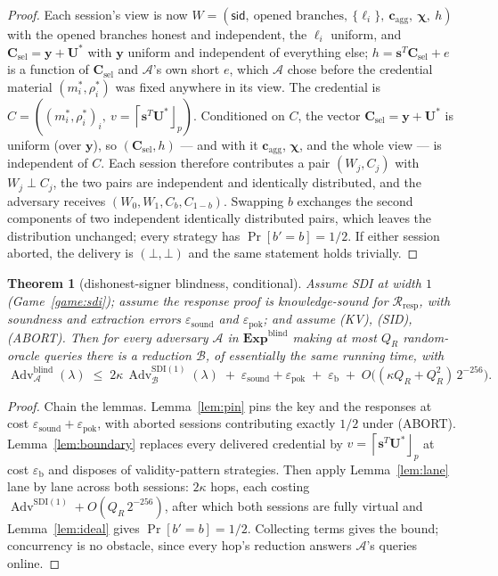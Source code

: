 \documentclass[11pt]{article}
\newcommand{\roundp}[1]{\left\lceil #1\right\rfloor_p}
\newcommand{\Adv}{\operatorname{Adv}}
\newcommand{\Exp}{\mathbf{Exp}}
\newtheorem{theorem}{Theorem}[section]
\begin{document}
\begin{proof}
Each session's view is now
$W=(\mathsf{sid},\ \text{opened branches},\ \{\ell_i\},\
 \mathbf c_{\mathrm{agg}},\ \boldsymbol\chi,\ h)$
with the opened branches honest and independent, the $\ell_i$ uniform, and
$\mathbf C_{\mathrm{sel}}=\mathbf y+\mathbf U^*$ with $\mathbf y$ uniform
and independent of everything else; $h=\mathbf s^{T}\mathbf
C_{\mathrm{sel}}+e$ is a function of $\mathbf C_{\mathrm{sel}}$ and
$\mathcal A$'s own short $e$, which $\mathcal A$ chose before the
credential material $(m_i^*,\rho_i^*)$ was fixed anywhere in its view.  The
credential is $C=((m_i^*,\rho_i^*)_i,\ v=\roundp{\mathbf s^{T}\mathbf
U^*})$.  Conditioned on $C$, the vector $\mathbf C_{\mathrm{sel}}=\mathbf
y+\mathbf U^*$ is uniform (over $\mathbf y$), so $(\mathbf
C_{\mathrm{sel}},h)$ --- and with it $\mathbf c_{\mathrm{agg}}$,
$\boldsymbol\chi$, and the whole view --- is independent of $C$.  Each
session therefore contributes a pair $(W_j,C_j)$ with $W_j\perp C_j$, the
two pairs are independent and identically distributed, and the adversary
receives $(W_0,W_1,C_b,C_{1-b})$.  Swapping $b$ exchanges the second
components of two independent identically distributed pairs, which leaves
the distribution unchanged; every strategy has $\Pr[b'=b]=1/2$.  If either
session aborted, the delivery is $(\bot,\bot)$ and the same statement holds
trivially.
\end{proof}

\begin{theorem}[dishonest-signer blindness, conditional]
\label{thm:blind}
Assume SDI at width $1$ (Game~\ref{game:sdi}); assume the response proof is
knowledge-sound for $\mathcal R_{\mathrm{resp}}$, with soundness and
extraction errors $\varepsilon_{\mathrm{sound}}$ and
$\varepsilon_{\mathrm{pok}}$; and assume (KV), (SID), (ABORT).  Then for
every adversary $\mathcal A$ in $\Exp^{\mathrm{blind}}$ making at most
$Q_R$ random-oracle queries there is a reduction $\mathcal B$, of
essentially the same running time, with
\[
 \Adv^{\mathrm{blind}}_{\mathcal A}(\lambda)
 \;\le\;
 2\kappa\,\Adv^{\mathrm{SDI}(1)}_{\mathcal B}(\lambda)
 \;+\;\varepsilon_{\mathrm{sound}}+\varepsilon_{\mathrm{pok}}
 \;+\;\varepsilon_{\mathrm{b}}
 \;+\;O\!\bigl((\kappa Q_R+Q_R^{2})\,2^{-256}\bigr).
\]
\end{theorem}

\begin{proof}
Chain the lemmas.  Lemma~\ref{lem:pin} pins the key and the responses at
cost $\varepsilon_{\mathrm{sound}}+\varepsilon_{\mathrm{pok}}$, with aborted
sessions contributing exactly $1/2$ under (ABORT).
Lemma~\ref{lem:boundary} replaces every delivered credential by
$v=\roundp{\mathbf s^{T}\mathbf U^*}$ at cost $\varepsilon_{\mathrm{b}}$ and
disposes of validity-pattern strategies.  Then apply
Lemma~\ref{lem:lane} lane by lane across both sessions: $2\kappa$ hops,
each costing $\Adv^{\mathrm{SDI}(1)}+O(Q_R\,2^{-256})$, after which both
sessions are fully virtual and Lemma~\ref{lem:ideal} gives
$\Pr[b'=b]=1/2$.  Collecting terms gives the bound; concurrency is no
obstacle, since every hop's reduction answers $\mathcal A$'s queries
online.
\end{proof}
\end{document}
